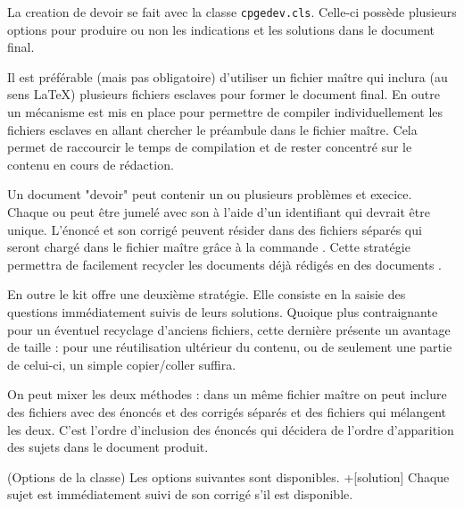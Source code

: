 \documentclass[11pt,report,oneside,solution]{cpgedev}
\let\CMD\cmd
\renewcommand\cmd[1]{{\spotcolor\CMD{#1}}}
\let\ENV\env
\renewcommand\env[1]{{\spotcolor\ENV{#1}}}
\begin{document}
La creation de devoir se fait avec la classe \verb+cpgedev.cls+. Celle-ci possède plusieurs options pour produire ou non les indications et les solutions dans le document final.

Il est préférable (mais pas obligatoire) d'utiliser un fichier maître qui inclura (au sens \LaTeX{}) plusieurs fichiers esclaves pour former le document final. En outre un mécanisme est mis en place pour permettre de compiler individuellement les fichiers esclaves en allant chercher le préambule dans le fichier maître. Cela permet de raccourcir le temps de compilation et de rester concentré sur le contenu en cours de rédaction. 

Un document "devoir" peut contenir un ou plusieurs problèmes et execice. Chaque  ou  peut être jumelé avec son  à l'aide d'un identifiant qui devrait être unique. L'énoncé et son corrigé peuvent résider dans des fichiers séparés qui seront chargé dans le fichier maître grâce à la commande . Cette stratégie permettra de facilement recycler les documents déjà rédigés en des documents . 

En outre le kit offre une deuxième stratégie. Elle consiste en la saisie des questions immédiatement suivis de leurs solutions. Quoique plus contraignante pour un éventuel recyclage d'anciens fichiers, cette dernière présente un avantage de taille : pour une réutilisation ultérieur du contenu, ou de seulement une partie de celui-ci, un simple copier/coller suffira. 

On peut mixer les deux méthodes : dans un même fichier maître on peut inclure des fichiers avec des énoncés et des corrigés séparés et des fichiers qui mélangent les deux. C'est l'ordre d'inclusion des énoncés qui décidera de l'ordre d'apparition des sujets dans le document produit.   



\partie(Options de la classe)
Les options suivantes sont disponibles. 
\xopt+[solution]
     Chaque sujet est immédiatement suivi de son corrigé s'il est disponible. 
     
     
\end{document}
